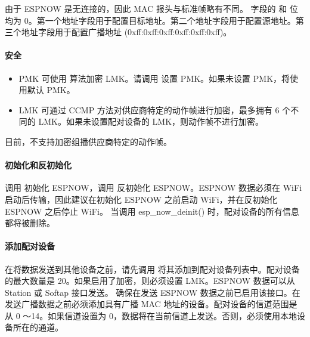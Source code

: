 \documentclass[a4paper,12pt,english]{sphinxmanual}
\begin{document}
{{\sphinxAtStartPar
由于 ESP\sphinxhyphen{}NOW 是无连接的，因此 MAC 报头与标准帧略有不同。 字段的  和  位均为 0。第一个地址字段用于配置目标地址。第二个地址字段用于配置源地址。第三个地址字段用于配置广播地址 (0xff:0xff:0xff:0xff:0xff:0xff)。


\paragraph{安全}
\label{\detokenize{exp-esp32/wifi/esp-now:id3}}
\sphinxAtStartPar
{}
\begin{itemize}
\item {} 
\sphinxAtStartPar
PMK 可使用  算法加密 LMK。请调用  设置 PMK。如果未设置 PMK，将使用默认 PMK。

\item {} 
\sphinxAtStartPar
LMK 可通过 CCMP 方法对供应商特定的动作帧进行加密，最多拥有 6 个不同的 LMK。如果未设置配对设备的 LMK，则动作帧不进行加密。

\end{itemize}

\sphinxAtStartPar
目前，不支持加密组播供应商特定的动作帧。


\paragraph{初始化和反初始化}
\label{\detokenize{exp-esp32/wifi/esp-now:id4}}
\sphinxAtStartPar
调用  初始化 ESP\sphinxhyphen{}NOW，调用  反初始化 ESP\sphinxhyphen{}NOW。ESP\sphinxhyphen{}NOW 数据必须在 Wi\sphinxhyphen{}Fi 启动后传输，因此建议在初始化 ESP\sphinxhyphen{}NOW 之前启动 Wi\sphinxhyphen{}Fi，并在反初始化 ESP\sphinxhyphen{}NOW 之后停止 Wi\sphinxhyphen{}Fi。 当调用 esp\_now\_deinit() 时，配对设备的所有信息都将被删除。


\paragraph{添加配对设备}
\label{\detokenize{exp-esp32/wifi/esp-now:id5}}
\sphinxAtStartPar
在将数据发送到其他设备之前，请先调用  将其添加到配对设备列表中。配对设备的最大数量是 20。如果启用了加密，则必须设置 LMK。ESP\sphinxhyphen{}NOW 数据可以从 Station 或 Softap 接口发送。 确保在发送 ESP\sphinxhyphen{}NOW 数据之前已启用该接口。在发送广播数据之前必须添加具有广播 MAC 地址的设备。配对设备的信道范围是从 0 ～14。如果信道设置为 0，数据将在当前信道上发送。否则，必须使用本地设备所在的通道。


}}
\end{document}
